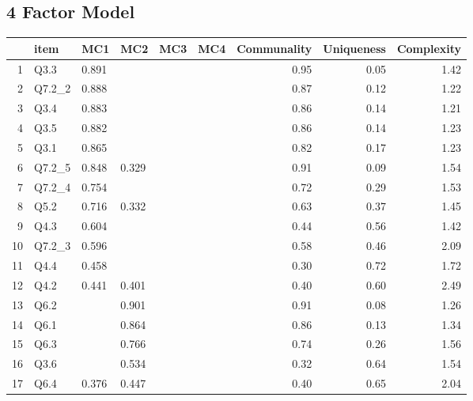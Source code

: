 \documentclass[../main.tex]{subfiles}
\begin{document}
        \subsection{4 Factor Model}

            \begin{table}[ht]
                \centering
                \begin{tabular}{rlllllrrr}
                    \hline
                    & item & MC1 & MC2 & MC3 & MC4 & Communality & Uniqueness & Complexity \\
                    \hline
                    1 & Q3.3 & 0.891 &  &  &  & 0.95 & 0.05 & 1.42 \\
                    2 & Q7.2\_2 & 0.888 &  &  &  & 0.87 & 0.12 & 1.22 \\
                    3 & Q3.4 & 0.883 &  &  &  & 0.86 & 0.14 & 1.21 \\
                    4 & Q3.5 & 0.882 &  &  &  & 0.86 & 0.14 & 1.23 \\
                    5 & Q3.1 & 0.865 &  &  &  & 0.82 & 0.17 & 1.23 \\
                    6 & Q7.2\_5 & 0.848 & 0.329 &  &  & 0.91 & 0.09 & 1.54 \\
                    7 & Q7.2\_4 & 0.754 &  &  &  & 0.72 & 0.29 & 1.53 \\
                    8 & Q5.2 & 0.716 & 0.332 &  &  & 0.63 & 0.37 & 1.45 \\
                    9 & Q4.3 & 0.604 &  &  &  & 0.44 & 0.56 & 1.42 \\
                    10 & Q7.2\_3 & 0.596 &  &  &  & 0.58 & 0.46 & 2.09 \\
                    11 & Q4.4 & 0.458 &  &  &  & 0.30 & 0.72 & 1.72 \\
                    12 & Q4.2 & 0.441 & 0.401 &  &  & 0.40 & 0.60 & 2.49 \\
                    13 & Q6.2 &  & 0.901 &  &  & 0.91 & 0.08 & 1.26 \\
                    14 & Q6.1 &  & 0.864 &  &  & 0.86 & 0.13 & 1.34 \\
                    15 & Q6.3 &  & 0.766 &  &  & 0.74 & 0.26 & 1.56 \\
                    16 & Q3.6 &  & 0.534 &  &  & 0.32 & 0.64 & 1.54 \\
                    17 & Q6.4 & 0.376 & 0.447 &  &  & 0.40 & 0.65 & 2.04 \\

\end{tabular}
\end{table}
\end{document}
